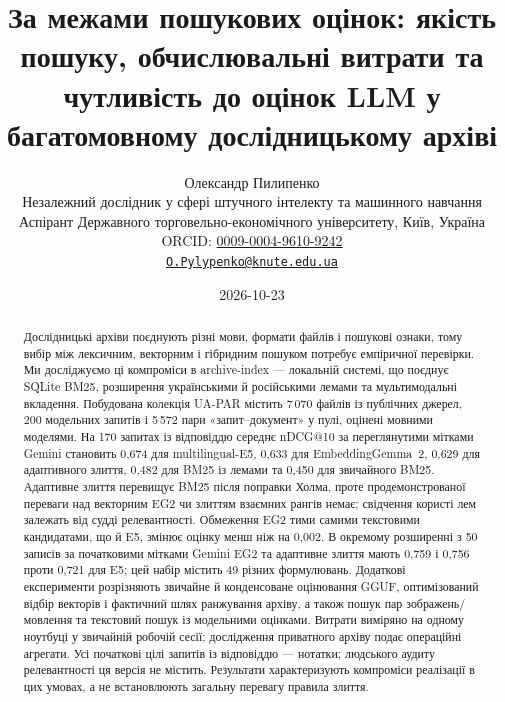 \documentclass[11pt]{article}
\begin{document}

\title{За межами пошукових оцінок: якість пошуку, обчислювальні витрати та чутливість до оцінок LLM у багатомовному дослідницькому архіві}
\author{Олександр Пилипенко\\[2pt]\small Незалежний дослідник у сфері штучного інтелекту та машинного навчання\\ \small Аспірант Державного торговельно-економічного університету, Київ, Україна\\[2pt]
\small ORCID: \href{https://orcid.org/0009-0004-9610-9242}{0009-0004-9610-9242}\\ \small\href{mailto:O.Pylypenko@knute.edu.ua}{\texttt{O.Pylypenko@knute.edu.ua}}}
\date{2026-10-23}
\maketitle

\begin{abstract}
\noindent
Дослідницькі архіви поєднують різні мови, формати файлів і пошукові ознаки, тому вибір між лексичним, векторним і гібридним пошуком потребує емпіричної перевірки. Ми досліджуємо ці компроміси в archive-index --- локальній системі, що поєднує SQLite BM25, розширення українськими й російськими лемами та мультимодальні вкладення. Побудована колекція UA-PAR містить 7\,070 файлів із публічних джерел, 200 модельних запитів і 5\,572 пари «запит--документ» у пулі, оцінені мовними моделями. На 170 запитах із відповіддю середнє nDCG@10 за переглянутими мітками Gemini становить 0,674 для multilingual-E5, 0,633 для EmbeddingGemma~2, 0,629 для адаптивного злиття, 0,482 для BM25 із лемами та 0,450 для звичайного BM25. Адаптивне злиття перевищує BM25 після поправки Холма, проте продемонстрованої переваги над векторним EG2 чи злиттям взаємних рангів немає; свідчення користі лем залежать від судді релевантності. Обмеження EG2 тими самими текстовими кандидатами, що й E5, змінює оцінку менш ніж на 0,002. В окремому розширенні з 50 записів за початковими мітками Gemini EG2 та адаптивне злиття мають 0,759 і 0,756 проти 0,721 для E5; цей набір містить 49 різних формулювань. Додаткові експерименти розрізняють звичайне й конденсоване оцінювання GGUF, оптимізований відбір векторів і фактичний шлях ранжування архіву, а також пошук пар зображень/мовлення та текстовий пошук із модельними оцінками. Витрати виміряно на одному ноутбуці у звичайній робочій сесії; дослідження приватного архіву подає операційні агрегати. Усі початкові цілі запитів із відповіддю --- нотатки; людського аудиту релевантності ця версія не містить. Результати характеризують компроміси реалізації в цих умовах, а не встановлюють загальну перевагу правила злиття.
\end{abstract}
\end{document}
